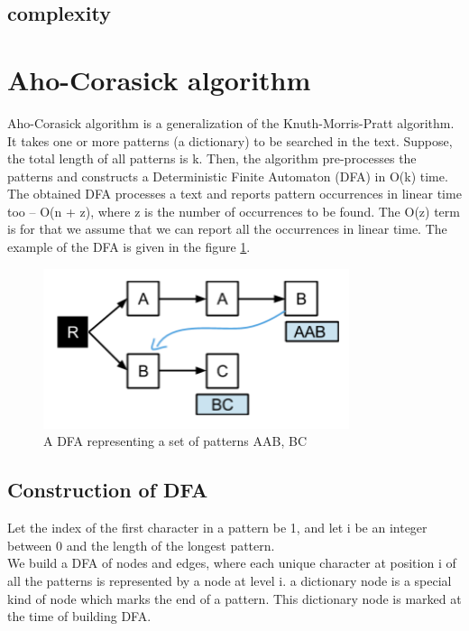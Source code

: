\documentclass[paper=a4, fontsize=11pt]{scrartcl} %
\numberwithin{equation}{section} %
\numberwithin{figure}{section} %
\numberwithin{table}{section} %
\begin{document}
\subsection{complexity}

\section{Aho-Corasick algorithm}
Aho-Corasick algorithm \cite{aho} is a generalization of the Knuth-Morris-Pratt algorithm. It takes one or more patterns (a dictionary) to be searched in the text. Suppose, the total length of all patterns is k. Then, the algorithm pre-processes the patterns and constructs a Deterministic Finite Automaton (DFA) \cite{hopcroft} in O(k) time. The obtained DFA processes a text and reports pattern occurrences in linear time too -- O(n + z), where z is the number of occurrences to be found. The O(z) term is for that we assume that we can report all the occurrences in linear time. The example of the DFA is given in the figure \ref{dfa}.

\begin{figure}[h!]
\centering
\includegraphics[width=0.8\textwidth]{figures/Example_DFA.png}
\caption{A DFA representing a set of patterns {AAB, BC}}
\label{dfa}
\end{figure}

\subsection{Construction of DFA}
Let the index of the first character in a pattern be 1, and let i be an integer between 0 and the length of the longest pattern.
\\
We build a DFA of nodes and edges, where each unique character at position i of all the patterns is represented by a node at level i. a dictionary node is a special kind of node which marks the end of a pattern. This dictionary node is marked at the time of building DFA.
\end{document}
